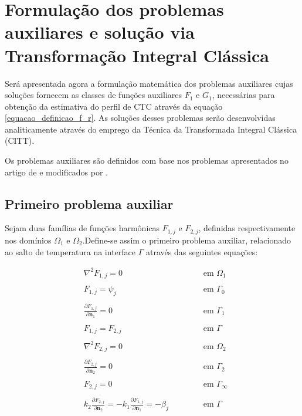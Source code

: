 \section{Formulação dos problemas auxiliares e solução via Transformação Integral Clássica}\label{secao_probs_aux}

Será apresentada agora a formulação matemática dos problemas auxiliares cujas soluções fornecem as classes de funções auxiliares $F_1$ e $G_1$, necessárias
para obtenção da estimativa do perfil de CTC através da equação \eqref{equacao_definicao_f_r}. As soluções desses problemas serão desenvolvidas analiticamente através do
emprego da Técnica da Transformada Integral Clássica (CITT). 

Os problemas auxiliares são definidos com base nos problemas apresentados no artigo de \cite{reciproc_2} e modificados por \cite{tese_abreu}.  

\subsection{Primeiro problema auxiliar}\label{secao_do_primeiro}

Sejam duas famílias de funções harmônicas $F_{1, j}$ e $F_{2, j}$, definidas respectivamente nos domínios $\Omega_1$ e $\Omega_2$.Define-se assim o primeiro
problema auxiliar, relacionado ao salto de temperatura na interface $\Gamma$ através das seguintes equações:

\begin{subequations}
\begin{alignat}{2}
	& \nabla^2 F_{1,j} = 0 \quad\quad\quad\quad\quad && \text{ em } \Omega_1 \label{funcao_F_harm_T1} \\ \nonumber \\
	& F_{1,j} = \psi_j && \text{ em } \Gamma_0  \label{funcao_F_cc_T1_2} \\ \nonumber \\
	& \frac{\partial F_{1,j}}{\partial \mathbf{n}_1} = 0 && \text{ em }  \Gamma_1 \label{funcao_F_cc_T1_1} \\ \nonumber \\
	& F_{1,j} = F_{2, j} \quad\quad\quad\quad\quad\quad\quad\quad && \text{ em }  \Gamma \label{funcao_F_cc_grad_T1} \\ \nonumber \\
	& \nabla^2 F_{2,j} = 0 && \text{ em }  \Omega_2 \label{funcao_F_harm_T2} \\ \nonumber \\
	& \frac{\partial F_{2,j}}{\partial \mathbf{n}_2} = 0 && \text{ em }  \Gamma_2 \label{funcao_F_cc_T1_3} \\ \nonumber \\
	& F_{2,j} = 0 && \text{ em }  \Gamma_\infty \label{funcao_F_cc_T1_4} \\ \nonumber \\
	& k_2\frac{\partial F_{2, j}}{\partial\mathbf{n}_2} = - k_1\frac{\partial F_{1,j}}{\partial\mathbf{n}_1} = -\beta_j && \text{ em }  \Gamma \label{funcao_F_cc_T1_5}
\end{alignat}
\end{subequations}


